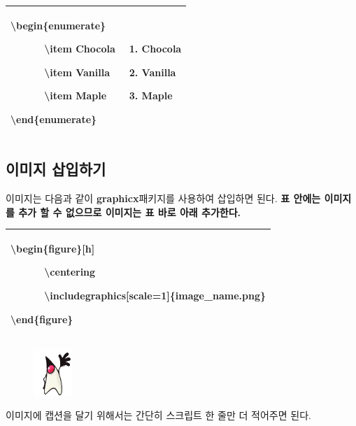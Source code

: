 \documentclass[12pt]{article}
\begin{document}
	\begin{tabularx}{\textwidth \onehalfspacing}{|X|X|}
		\hline
		\textbackslash begin\{enumerate\}
		
		\ \ \ \ \ \ \textbackslash item Chocola
		
		\ \ \ \ \ \ \textbackslash item Vanilla
		
		\ \ \ \ \ \ \textbackslash item Maple
		
		\textbackslash end\{enumerate\}
		&
		\begin{enumerate}
			\item Chocola
			\item Vanilla
			\item Maple
		\end{enumerate}
		\\
		\hline
	\end{tabularx}
	\clearpage
	\subsection{이미지 삽입하기}
	이미지는 다음과 같이 \textbf{graphicx}패키지를 사용하여 삽입하면 된다.\newline
	\textbf{표 안에는 이미지를 추가 할 수 없으므로 이미지는 표 바로 아래 추가한다.}\newline
	
	\begin{tabularx}{\textwidth \onehalfspacing}{|X|}
		\hline
		\textbackslash begin\{figure\}[h]
		
		\ \ \ \ \ \ \textbackslash centering
		
		\ \ \ \ \ \ \textbackslash includegraphics[scale=1]\{image\_name.png\}
		
		\textbackslash end\{figure\}
		\\
		\hline
	\end{tabularx}
	\begin{figure}[h]
		\centering
		\includegraphics[scale=1]{T6.png}
	\end{figure}
	\newline 이미지에 캡션을 달기 위해서는 간단히 스크립트 한 줄만 더 적어주면 된다.\newline
	
\end{document}
